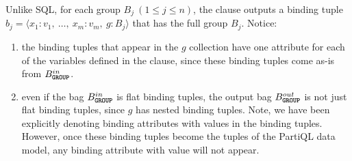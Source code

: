 Unlike SQL, for each group $B_j ~ (1 \leq j \leq n)$, the  clause
outputs a binding tuple $b_j = \langle x_1 : v_1, ~ \ldots, ~ x_m : v_m, ~ g :
B_j \rangle$ that has the full group $B_j$. Notice:
\begin{enumerate}
\item the binding tuples that appear in the $g$ collection have one attribute
for each of the variables defined in the  clause,
since these binding tuples come as-is from $B^{in}_{\texttt{\textbf{GROUP}}}$.
\item even if the bag $B^{in}_{\texttt{\textbf{GROUP}}}$ is flat binding tuples, the output
bag $B^{out}_{\texttt{\textbf{GROUP}}}$ is not just flat binding tuples, since $g$ has nested
binding tuples. Note, we have been explicitly denoting binding attributes
with \MISSING values in the binding tuples. However, once these binding tuples
become the tuples of the PartiQL data model, any binding attribute with 
\MISSING value will not appear.
\end{enumerate}


